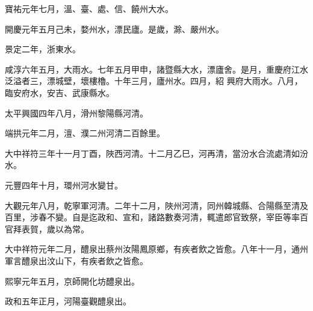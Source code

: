 \begin{pinyinscope}
 寶祐元年七月，溫、臺、處、信、饒州大水。



 開慶元年五月己未，婺州水，漂民廬。是歲，滁、嚴州水。



 景定二年，浙東水。



 咸淳六年五月，大雨水。七年五月甲申，諸暨縣大水，漂廬舍。是月，重慶府江水泛溢者三，漂城壁，壞樓櫓。十年三月，廬州水。四月，紹
 興府大雨水。八月，臨安府水，安吉、武康縣水。



 太平興國四年八月，滑州黎陽縣河清。



 端拱元年二月，澶、濮二州河清二百餘里。



 大中祥符三年十一月丁酉，陜西河清。十二月乙巳，河再清，當汾水合流處清如汾水。



 元豐四年十月，環州河水變甘。



 大觀元年八月，乾寧軍河清。二年十二月，陜州河清，同州韓城縣、合陽縣至清及百里，涉春不變。自是迄政和、宣和，諸路數奏河清，輒遣郎官致祭，宰臣等率百官拜表賀，歲以為常。



 大中祥符元年二月，醴泉出蔡州汝陽鳳原鄉，有疾者飲之皆愈。八年十一月，通州軍言醴泉出汶山下，有疾者飲之皆愈。



 熙寧元年五月，京師開化坊醴泉出。



 政和五年正月，河陽臺觀醴泉出。



\end{pinyinscope}